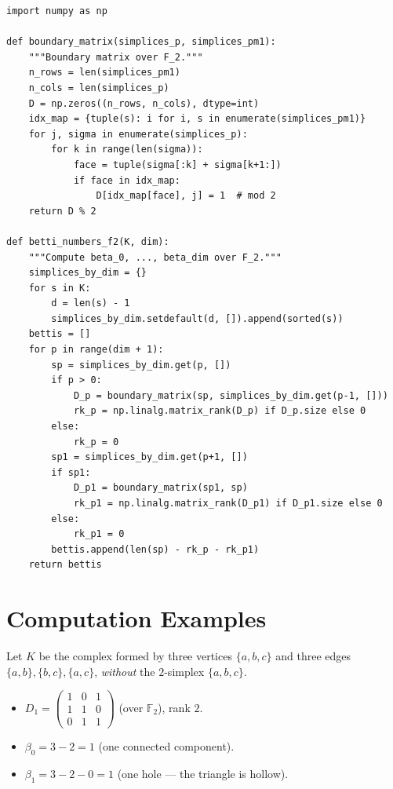 \begin{codeblock}[title=\textbf{Homology via Matrix Computation}]
\begin{verbatim}
import numpy as np

def boundary_matrix(simplices_p, simplices_pm1):
    """Boundary matrix over F_2."""
    n_rows = len(simplices_pm1)
    n_cols = len(simplices_p)
    D = np.zeros((n_rows, n_cols), dtype=int)
    idx_map = {tuple(s): i for i, s in enumerate(simplices_pm1)}
    for j, sigma in enumerate(simplices_p):
        for k in range(len(sigma)):
            face = tuple(sigma[:k] + sigma[k+1:])
            if face in idx_map:
                D[idx_map[face], j] = 1  # mod 2
    return D % 2

def betti_numbers_f2(K, dim):
    """Compute beta_0, ..., beta_dim over F_2."""
    simplices_by_dim = {}
    for s in K:
        d = len(s) - 1
        simplices_by_dim.setdefault(d, []).append(sorted(s))
    bettis = []
    for p in range(dim + 1):
        sp = simplices_by_dim.get(p, [])
        if p > 0:
            D_p = boundary_matrix(sp, simplices_by_dim.get(p-1, []))
            rk_p = np.linalg.matrix_rank(D_p) if D_p.size else 0
        else:
            rk_p = 0
        sp1 = simplices_by_dim.get(p+1, [])
        if sp1:
            D_p1 = boundary_matrix(sp1, sp)
            rk_p1 = np.linalg.matrix_rank(D_p1) if D_p1.size else 0
        else:
            rk_p1 = 0
        bettis.append(len(sp) - rk_p - rk_p1)
    return bettis
\end{verbatim}
\end{codeblock}

\section{Computation Examples}

\begin{example}
Let $K$ be the complex formed by three vertices $\{a, b, c\}$ and three
edges $\{a,b\}, \{b,c\}, \{a,c\}$, \emph{without} the $2$-simplex
$\{a,b,c\}$.
\begin{itemize}
  \item $D_1 = \begin{pmatrix} 1 & 0 & 1 \\ 1 & 1 & 0 \\ 0 & 1 & 1 \end{pmatrix}$
        (over $\mathbb{F}_2$), rank $2$.
  \item $\beta_0 = 3 - 2 = 1$ (one connected component).
  \item $\beta_1 = 3 - 2 - 0 = 1$ (one hole --- the triangle is hollow).
\end{itemize}
\end{example}


